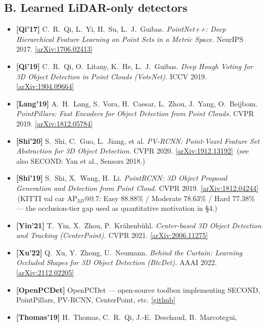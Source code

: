 \documentclass[10pt,a4paper]{article}
\begin{document}
{\subsection*{B. Learned LiDAR-only detectors}
\begin{itemize}[leftmargin=1.4em,itemsep=3pt,topsep=2pt]
  \item \textbf{[Qi'17]} C.~R.~Qi, L.~Yi, H.~Su, L.~J.~Guibas. \emph{PointNet++: Deep
  Hierarchical Feature Learning on Point Sets in a Metric Space.} NeurIPS 2017.
  \href{https://arxiv.org/abs/1706.02413}{[arXiv:1706.02413]}
  \item \textbf{[Qi'19]} C.~R.~Qi, O.~Litany, K.~He, L.~J.~Guibas. \emph{Deep Hough Voting
  for 3D Object Detection in Point Clouds (VoteNet).} ICCV 2019.
  \href{https://arxiv.org/abs/1904.09664}{[arXiv:1904.09664]}
  \item \textbf{[Lang'19]} A.~H.~Lang, S.~Vora, H.~Caesar, L.~Zhou, J.~Yang, O.~Beijbom.
  \emph{PointPillars: Fast Encoders for Object Detection from Point Clouds.} CVPR 2019.
  \href{https://arxiv.org/abs/1812.05784}{[arXiv:1812.05784]}
  \item \textbf{[Shi'20]} S.~Shi, C.~Guo, L.~Jiang, et al. \emph{PV-RCNN: Point-Voxel
  Feature Set Abstraction for 3D Object Detection.} CVPR 2020.
  \href{https://arxiv.org/abs/1912.13192}{[arXiv:1912.13192]} \,(see also SECOND: Yan et
  al., Sensors 2018.)
  \item \textbf{[Shi'19]} S.~Shi, X.~Wang, H.~Li. \emph{PointRCNN: 3D Object Proposal
  Generation and Detection from Point Cloud.} CVPR 2019.
  \href{https://arxiv.org/abs/1812.04244}{[arXiv:1812.04244]} \,(KITTI val car
  AP$_{3D}$@0.7: Easy 88.88\% / Moderate 78.63\% / Hard 77.38\% --- the occlusion-tier gap
  used as quantitative motivation in \S4.)
  \item \textbf{[Yin'21]} T.~Yin, X.~Zhou, P.~Kr\"ahenb\"uhl. \emph{Center-based 3D Object
  Detection and Tracking (CenterPoint).} CVPR 2021.
  \href{https://arxiv.org/abs/2006.11275}{[arXiv:2006.11275]}
  \item \textbf{[Xu'22]} Q.~Xu, Y.~Zhong, U.~Neumann. \emph{Behind the Curtain: Learning
  Occluded Shapes for 3D Object Detection (BtcDet).} AAAI 2022.
  \href{https://arxiv.org/abs/2112.02205}{[arXiv:2112.02205]}
  \item \textbf{[OpenPCDet]} OpenPCDet --- open-source toolbox implementing SECOND,
  PointPillars, PV-RCNN, CenterPoint, etc. \href{https://github.com/open-mmlab/OpenPCDet}{[github]}
  \item \textbf{[Thomas'19]} H.~Thomas, C.~R.~Qi, J.-E.~Deschaud, B.~Marcotegui,

\end{itemize}}
\end{document}
